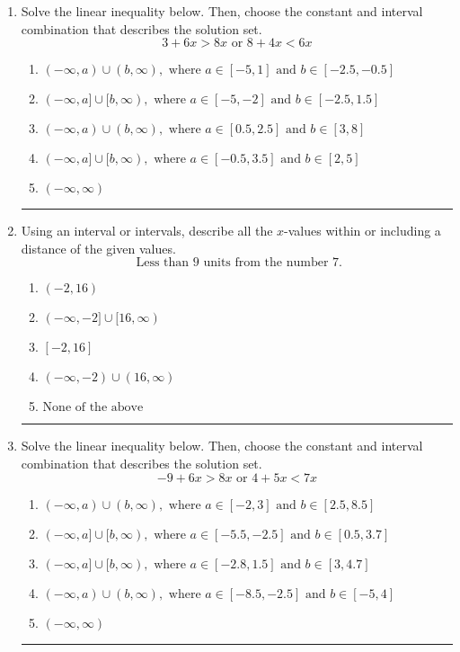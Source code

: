 \documentclass[14pt]{extbook}
\newcommand{\litem}[1]{\item#1\hspace*{-1cm}\rule{\textwidth}{0.4pt}}
\begin{document}
\begin{enumerate}
{\begin{enumerate}[label=\Alph*.]
\end{enumerate} }
\litem{
Solve the linear inequality below. Then, choose the constant and interval combination that describes the solution set.\[ 3 + 6 x > 8 x \text{ or } 8 + 4 x < 6 x \]\begin{enumerate}[label=\Alph*.]
\item \( (-\infty, a) \cup (b, \infty), \text{ where } a \in [-5, 1] \text{ and } b \in [-2.5, -0.5] \)
\item \( (-\infty, a] \cup [b, \infty), \text{ where } a \in [-5, -2] \text{ and } b \in [-2.5, 1.5] \)
\item \( (-\infty, a) \cup (b, \infty), \text{ where } a \in [0.5, 2.5] \text{ and } b \in [3, 8] \)
\item \( (-\infty, a] \cup [b, \infty), \text{ where } a \in [-0.5, 3.5] \text{ and } b \in [2, 5] \)
\item \( (-\infty, \infty) \)

\end{enumerate} }
\litem{
Using an interval or intervals, describe all the $x$-values within or including a distance of the given values.\[ \text{ Less than } 9 \text{ units from the number } 7. \]\begin{enumerate}[label=\Alph*.]
\item \( (-2, 16) \)
\item \( (-\infty, -2] \cup [16, \infty) \)
\item \( [-2, 16] \)
\item \( (-\infty, -2) \cup (16, \infty) \)
\item \( \text{None of the above} \)

\end{enumerate} }
\litem{
Solve the linear inequality below. Then, choose the constant and interval combination that describes the solution set.\[ -9 + 6 x > 8 x \text{ or } 4 + 5 x < 7 x \]\begin{enumerate}[label=\Alph*.]
\item \( (-\infty, a) \cup (b, \infty), \text{ where } a \in [-2, 3] \text{ and } b \in [2.5, 8.5] \)
\item \( (-\infty, a] \cup [b, \infty), \text{ where } a \in [-5.5, -2.5] \text{ and } b \in [0.5, 3.7] \)
\item \( (-\infty, a] \cup [b, \infty), \text{ where } a \in [-2.8, 1.5] \text{ and } b \in [3, 4.7] \)
\item \( (-\infty, a) \cup (b, \infty), \text{ where } a \in [-8.5, -2.5] \text{ and } b \in [-5, 4] \)
\item \( (-\infty, \infty) \)


\end{enumerate}}
\end{enumerate}
\end{document}
